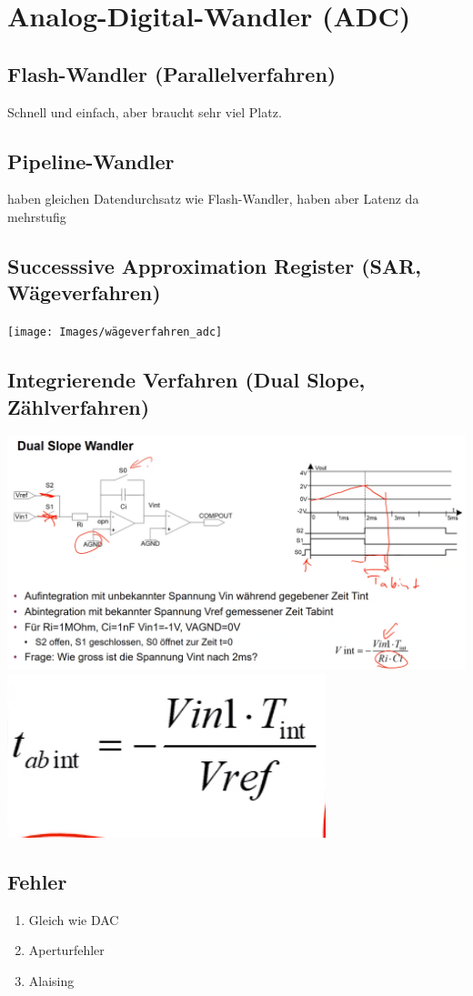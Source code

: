 \section{Analog-Digital-Wandler (ADC)}
\subsection{Flash-Wandler (Parallelverfahren)}
Schnell und einfach, aber braucht sehr viel Platz.

\subsection{Pipeline-Wandler}
haben gleichen Datendurchsatz wie Flash-Wandler, haben aber Latenz da mehrstufig

\subsection{Successsive Approximation Register (SAR, Wägeverfahren)}
\texttt{[image: Images/wägeverfahren\_adc]}

\subsection{Integrierende Verfahren (Dual Slope, Zählverfahren)}
\includegraphics[width=\columnwidth]{Images/dual_slop_adc}
\includegraphics[width=0.2\columnwidth]{Images/dual_slop_adc1_2}


\subsection{Fehler}

\begin{enumerate}[nosep]
	\item Gleich wie DAC
	\item Aperturfehler
	\item Alaising
\end{enumerate}